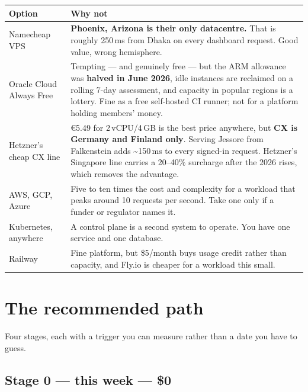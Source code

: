 \documentclass[11pt,a4paper]{article}
\newcommand{\hd}[1]{\textbf{\sffamily\small #1}}
\begin{document}
\begin{center}
\begin{tabular}{@{}L{4.3cm}L{10.5cm}@{}}
\toprule
\hd{Option} & \hd{Why not} \\
\midrule
Namecheap VPS & \textbf{Phoenix, Arizona is their only datacentre.} That is roughly 250\,ms from Dhaka on every dashboard request. Good value, wrong hemisphere. \\
Oracle Cloud Always Free & Tempting --- and genuinely free --- but the ARM allowance was \textbf{halved in June 2026}, idle instances are reclaimed on a rolling 7-day assessment, and capacity in popular regions is a lottery. Fine as a free self-hosted CI runner; not for a platform holding members' money. \\
Hetzner's cheap CX line & \euro{}5.49 for 2\,vCPU/4\,GB is the best price anywhere, but \textbf{CX is Germany and Finland only}. Serving Jessore from Falkenstein adds \textasciitilde150\,ms to every signed-in request. Hetzner's Singapore line carries a 20--40\% surcharge after the 2026 rises, which removes the advantage. \\
AWS, GCP, Azure & Five to ten times the cost and complexity for a workload that peaks around 10 requests per second. Take one only if a funder or regulator names it. \\
Kubernetes, anywhere & A control plane is a second system to operate. You have one service and one database. \\
Railway & Fine platform, but \$5/month buys usage credit rather than capacity, and Fly.io is cheaper for a workload this small. \\
\bottomrule
\end{tabular}
\end{center}

\clearpage
\section{The recommended path}

Four stages, each with a trigger you can measure rather than a date you have to guess.

\subsection{Stage 0 --- this week --- \$0}
\end{document}
